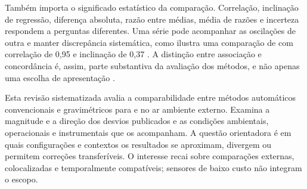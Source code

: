 Também importa o significado estatístico da comparação. Correlação, inclinação de regressão, diferença absoluta, razão entre médias, média de razões e incerteza respondem a perguntas diferentes. Uma série pode acompanhar as oscilações de outra e manter discrepância sistemática, como ilustra uma comparação de \MPdez{} com correlação de 0,95 e inclinação de 0,37 \parencite{rsl129}. A distinção entre associação e concordância é, assim, parte substantiva da avaliação dos métodos, e não apenas uma escolha de apresentação \parencite{bland1986}.

Esta revisão sistematizada avalia a comparabilidade entre métodos automáticos convencionais e gravimétricos para \MPdez{} e \MPdoiscinco{} no ar ambiente externo. Examina a magnitude e a direção dos desvios publicados e as condições ambientais, operacionais e instrumentais que os acompanham. A questão orientadora é em quais configurações e contextos os resultados se aproximam, divergem ou permitem correções transferíveis. O interesse recai sobre comparações externas, colocalizadas e temporalmente compatíveis; sensores de baixo custo não integram o escopo.
